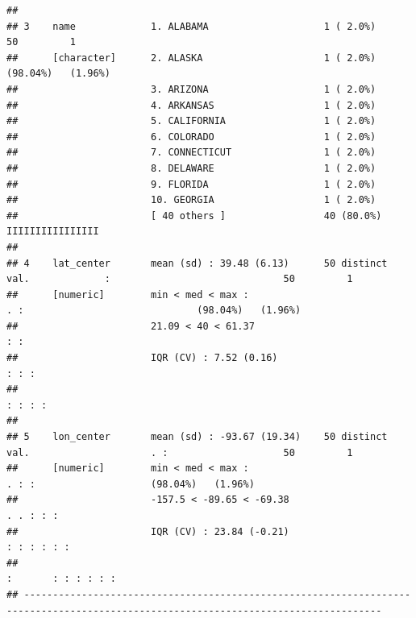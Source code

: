 \documentclass[]{article}
\begin{document}
\begin{verbatim}
## 
## 3    name             1. ALABAMA                    1 ( 2.0%)                                                   50         1        
##      [character]      2. ALASKA                     1 ( 2.0%)                                                   (98.04%)   (1.96%)  
##                       3. ARIZONA                    1 ( 2.0%)                                                                       
##                       4. ARKANSAS                   1 ( 2.0%)                                                                       
##                       5. CALIFORNIA                 1 ( 2.0%)                                                                       
##                       6. COLORADO                   1 ( 2.0%)                                                                       
##                       7. CONNECTICUT                1 ( 2.0%)                                                                       
##                       8. DELAWARE                   1 ( 2.0%)                                                                       
##                       9. FLORIDA                    1 ( 2.0%)                                                                       
##                       10. GEORGIA                   1 ( 2.0%)                                                                       
##                       [ 40 others ]                 40 (80.0%)           IIIIIIIIIIIIIIII                                           
## 
## 4    lat_center       mean (sd) : 39.48 (6.13)      50 distinct val.             :                              50         1        
##      [numeric]        min < med < max :                                        . :                              (98.04%)   (1.96%)  
##                       21.09 < 40 < 61.37                                       : :                                                  
##                       IQR (CV) : 7.52 (0.16)                                 : : :                                                  
##                                                                              : : : :                                                
## 
## 5    lon_center       mean (sd) : -93.67 (19.34)    50 distinct val.                     . :                    50         1        
##      [numeric]        min < med < max :                                                . : :                    (98.04%)   (1.96%)  
##                       -157.5 < -89.65 < -69.38                                     . . : : :                                        
##                       IQR (CV) : 23.84 (-0.21)                                   : : : : : :                                        
##                                                                          :       : : : : : :                                        
## ------------------------------------------------------------------------------------------------------------------------------------
\end{verbatim}
\end{document}
